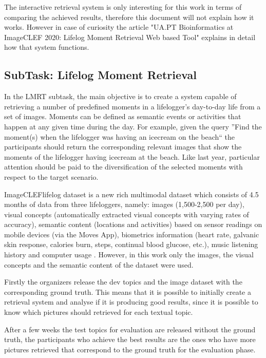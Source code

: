 The interactive retrieval system is only interesting for this work in terms of comparing the achieved results, therefore this document will not explain how it works. However in case of curiosity the article "UA.PT Bioinformatics at ImageCLEF 2020: Lifelog Moment Retrieval Web based Tool" \cite{Ribeiro2020} explains in detail how that system functions.

    \subsection{SubTask: Lifelog Moment Retrieval}
    In the LMRT subtask, the main objective is to create a system capable of retrieving a number of predefined moments in a lifelogger’s day-to-day life from a set of images. Moments can be defined as semantic events or activities that happen at any given time during the day. For example, given the query ”Find the moment(s) when the lifelogger was having an icecream on the beach“ the participants should return the corresponding relevant images that show the moments of the lifelogger having icecream at the beach. Like last year, particular attention should be paid to the diversification of the selected moments with respect to the target scenario.

    ImageCLEFlifelog dataset is a new rich multimodal dataset which consists of 4.5 months of data from three lifeloggers, namely: images (1,500-2,500 per day), visual concepts (automatically extracted visual concepts with varying rates of accuracy), semantic content (locations and activities) based on sensor readings on mobile devices (via the Moves App), biometrics information (heart rate, galvanic skin response, calories burn, steps, continual blood glucose, etc.), music listening history and computer usage . However, in this work only the images, the visual concepts and the semantic content of the dataset were used.

    Firstly the organizers release the dev topics and the image dataset with the corresponding ground truth. This means that it is possible to initially create a retrieval system and analyse if it is producing good results, since it is possible to know which pictures should retrieved for each textual topic. 

    After a few weeks the test topics for evaluation are released without the ground truth, the participants who achieve the best results are the ones who have more pictures retrieved that correspond to the ground truth for the evaluation phase.


